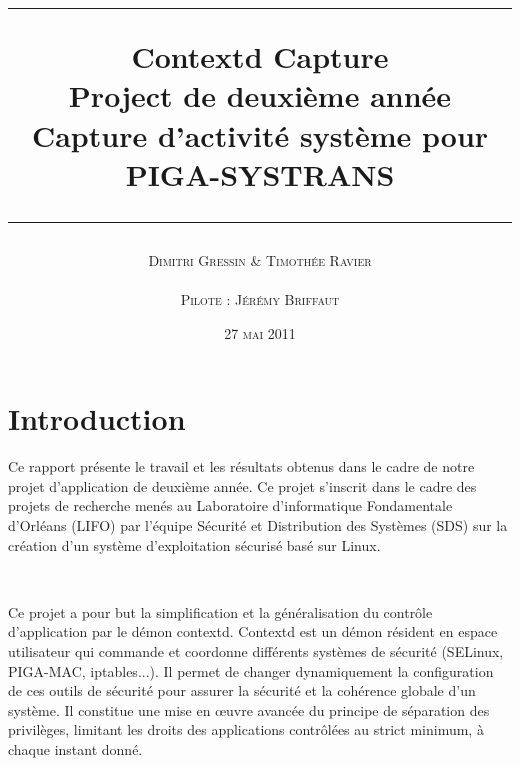 \documentclass[pdftex,a4paper,titlepage,11pt]{article}
\newcommand{\nom}[1]{\textsc{#1}}
\newcommand{\ligne}[1][1pt]{
  \par\noindent
  \rule[.5ex]{\linewidth}{#1}\par}
\newcommand{\clearemptydoublepage}{
	\newpage{\pagestyle{empty}\cleardoublepage}}
\begin{document}
\setlength{\parskip}{2.4ex}

\title{
\ligne{\Large}
\textbf{Contextd Capture}\\
\textbf{Project de deuxième année}\\
\Large Capture d'activité système pour PIGA-SYSTRANS
\ligne{\Large}
}
\author{\nom{Dimitri Gressin} \& \nom{Timothée Ravier}\\\\\nom{Pilote : Jérémy Briffaut}}
\date{27 \textsc{mai} 2011}

\maketitle

\clearemptydoublepage

\setcounter{secnumdepth}{3}
\setcounter{tocdepth}{2}
\tableofcontents
\addtocounter{page}{-1}

\newpage

\section*{Introduction} 
Ce rapport présente le travail et les résultats obtenus dans le cadre de notre projet d'application de deuxième année. Ce projet s'inscrit dans le cadre des projets de recherche menés au Laboratoire d'informatique Fondamentale d'Orléans (LIFO) par l'équipe Sécurité et Distribution des Systèmes (SDS) sur la création d'un système d'exploitation sécurisé basé sur Linux.

~

Ce projet a pour but la simplification et la généralisation du contrôle d'application par le démon contextd. Contextd est un démon résident en espace utilisateur qui commande et coordonne différents systèmes de sécurité (SELinux, PIGA-MAC, iptables...). Il permet de changer dynamiquement la configuration de ces outils de sécurité pour assurer la sécurité et la cohérence globale d'un système. Il constitue une mise en œuvre avancée du principe de séparation des privilèges, limitant les droits des applications contrôlées au strict minimum, à chaque instant donné.

~
\end{document}
